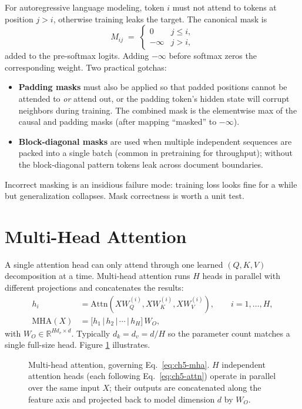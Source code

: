 For autoregressive language modeling, token $i$ must not attend to
tokens at position $j > i$, otherwise training leaks the target.
The canonical mask is
\begin{equation}
M_{ij} \;=\;
\begin{cases}
0            & j \le i, \\
-\infty      & j > i,
\end{cases}
\end{equation}
added to the pre-softmax logits. Adding $-\infty$ before softmax zeros
the corresponding weight. Two practical gotchas:
\begin{itemize}
  \item \textbf{Padding masks} must also be applied so that padded
        positions cannot be attended to \emph{or} attend out, or the
        padding token's hidden state will corrupt neighbors during
        training. The combined mask is the elementwise max of the
        causal and padding masks (after mapping ``masked'' to
        $-\infty$).
  \item \textbf{Block-diagonal masks} are used when multiple
        independent sequences are packed into a single batch (common
        in pretraining for throughput); without the block-diagonal
        pattern tokens leak across document boundaries.
\end{itemize}
Incorrect masking is an insidious failure mode: training loss looks
fine for a while but generalization collapses. Mask correctness is
worth a unit test.

\section{Multi-Head Attention}

A single attention head can only attend through one learned
$(Q, K, V)$ decomposition at a time. Multi-head attention
\citep{vaswani2017attention} runs $H$ heads in parallel with different
projections and concatenates the results:
\begin{align}
h_i &= \mathrm{Attn}(X W_Q^{(i)}, X W_K^{(i)}, X W_V^{(i)}),
      \qquad i = 1, \ldots, H, \\
\mathrm{MHA}(X) &= \bigl[h_1 \,|\, h_2 \,|\, \cdots \,|\, h_H\bigr]\, W_O,
\label{eq:ch5-mha}
\end{align}
with $W_O \in \mathbb{R}^{H d_v \times d}$. Typically $d_k = d_v = d/H$
so the parameter count matches a single full-size head. Figure
\ref{fig:week4-mha} illustrates.

\begin{figure}[h]
\centering

\caption{Multi-head attention, governing Eq.~\eqref{eq:ch5-mha}.
  $H$ independent attention heads (each following
  Eq.~\eqref{eq:ch5-attn}) operate in parallel over the same input
  $X$; their outputs are concatenated along the feature axis and
  projected back to model dimension $d$ by $W_O$.}
\label{fig:week4-mha}
\end{figure}

